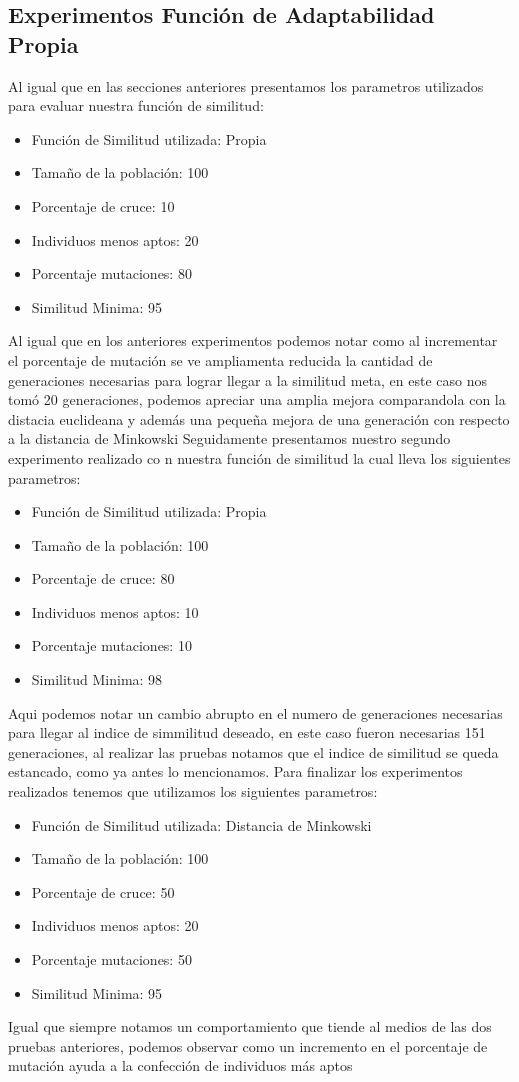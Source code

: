 \documentclass[conference]{C:/Program Files (x86)/MiKTeX 2.9/tex/latex/ltxmisc/IEEEtran}
\begin{document}
\subsection{Experimentos Función de Adaptabilidad Propia}
\par
Al igual que en las secciones anteriores presentamos los parametros utilizados para evaluar nuestra función de similitud:
\begin{itemize}
	\item Función de Similitud utilizada: Propia
	\item Tamaño de la población: 100
	\item Porcentaje de cruce: 10
	\item Individuos menos aptos: 20
	\item Porcentaje mutaciones: 80
	\item Similitud Minima: 95
\end{itemize}
Al igual que en los anteriores experimentos podemos notar como al incrementar el porcentaje de mutación se ve ampliamenta reducida la cantidad de generaciones necesarias para lograr llegar a la similitud meta, en este caso nos tomó 20 generaciones, podemos apreciar una amplia mejora comparandola con la distacia euclideana y además una pequeña mejora de una generación con respecto a la distancia de Minkowski
Seguidamente presentamos nuestro segundo experimento realizado co n nuestra función de similitud la cual lleva los siguientes parametros:
\begin{itemize}
	\item Función de Similitud utilizada: Propia
	\item Tamaño de la población: 100
	\item Porcentaje de cruce: 80
	\item Individuos menos aptos: 10
	\item Porcentaje mutaciones: 10
	\item Similitud Minima: 98
\end{itemize}
Aqui podemos notar un cambio abrupto en el numero de generaciones necesarias para llegar al indice de simmilitud deseado, en este caso fueron necesarias 151 generaciones, al realizar las pruebas notamos que el indice de similitud se queda estancado, como ya antes lo mencionamos.
Para finalizar los experimentos realizados tenemos que utilizamos los siguientes parametros:
\begin{itemize}
	\item Función de Similitud utilizada: Distancia de Minkowski
	\item Tamaño de la población: 100
	\item Porcentaje de cruce: 50
	\item Individuos menos aptos: 20
	\item Porcentaje mutaciones: 50
	\item Similitud Minima: 95
\end{itemize}
Igual que siempre notamos un comportamiento que tiende al medios de las dos pruebas anteriores, podemos observar como un incremento en el porcentaje de mutación ayuda a la confección de individuos más aptos
\end{document}
